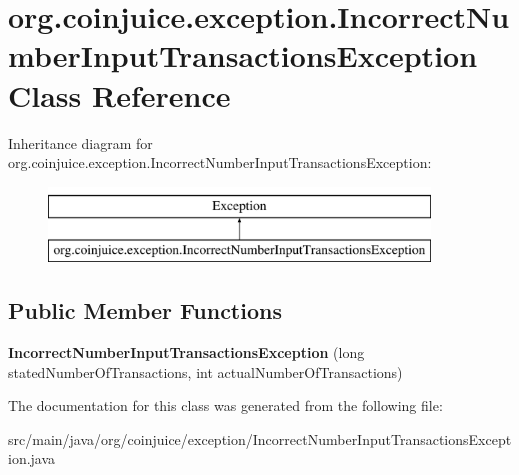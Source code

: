 \hypertarget{classorg_1_1coinjuice_1_1exception_1_1_incorrect_number_input_transactions_exception}{\section{org.\-coinjuice.\-exception.\-Incorrect\-Number\-Input\-Transactions\-Exception Class Reference}
\label{classorg_1_1coinjuice_1_1exception_1_1_incorrect_number_input_transactions_exception}
}
Inheritance diagram for org.\-coinjuice.\-exception.\-Incorrect\-Number\-Input\-Transactions\-Exception\-:\begin{figure}[H]
\begin{center}
\leavevmode
\includegraphics[height=2.000000cm]{classorg_1_1coinjuice_1_1exception_1_1_incorrect_number_input_transactions_exception}
\end{center}
\end{figure}
\subsection*{Public Member Functions}
\begin{DoxyCompactItemize}
\item 
\hypertarget{classorg_1_1coinjuice_1_1exception_1_1_incorrect_number_input_transactions_exception_ae9135d79bb7af0dab1eb2c484d530aa3}{{\bfseries Incorrect\-Number\-Input\-Transactions\-Exception} (long stated\-Number\-Of\-Transactions, int actual\-Number\-Of\-Transactions)}\label{classorg_1_1coinjuice_1_1exception_1_1_incorrect_number_input_transactions_exception_ae9135d79bb7af0dab1eb2c484d530aa3}

\end{DoxyCompactItemize}


The documentation for this class was generated from the following file\-:\begin{DoxyCompactItemize}
\item 
src/main/java/org/coinjuice/exception/Incorrect\-Number\-Input\-Transactions\-Exception.\-java\end{DoxyCompactItemize}
